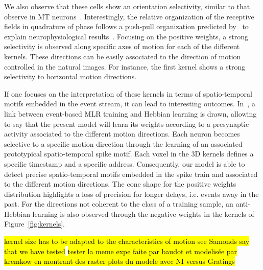 \documentclass[default]{sn-jnl}%
\theoremstyle{thmstyleone}%
\theoremstyle{thmstyletwo}%
\theoremstyle{thmstylethree}%
\newcommand{\note}[1]{{\sethlcolor{yellow}\hl{#1}}}
\begin{document}
We also observe that these cells show an orientation selectivity, similar to that observe in MT neurons~\citep{deangelis_functional_1999}. Interestingly, the relative organization of the receptive fields in quadrature of phase follows a push-pull organization predicted by~\citet{kremkow_push-pull_2016} to explain neurophysiological results~\citep{baudot_animation_2013}.  
Focusing on the positive weights, a strong selectivity is observed along specific axes of motion for each of the different kernels. These directions can be easily associated to the direction of motion controlled in the natural images. For instance, the first kernel shows a strong selectivity to horizontal motion directions.
%

If one focuses on the interpretation of these kernels in terms of spatio-temporal motifs embedded in the event stream, it can lead to interesting outcomes. In~\citep{grimaldi_robust_2022}, a link between event-based MLR training and Hebbian learning is drawn, allowing to say that the present model will learn its weights according to a presynaptic activity associated to the different motion directions. Each neuron becomes selective to a specific motion direction through the learning of an associated prototypical spatio-temporal spike motif. Each voxel in the 3D kernels defines a specific timestamp and a specific address. Consequently, our model is able to detect precise spatio-temporal motifs embedded in the spike train and associated to the different motion directions. The cone shape for the positive weights distribution highlights a loss of precision for longer delays, i.e. events away in the past. For the directions not coherent to the class of a training sample, an anti-Hebbian learning is also observed through the negative weights in the kernels of Figure~\ref{fig:kernels}. 

%
\note{kernel size has to be adapted to the characteristics of motion see Samonds %
say that we have tested }
\note{tester la meme expe faite par baudot et modelisée par kremkow en montrant des raster plots du modele avec NI versus Gratings }

%
\end{document}
